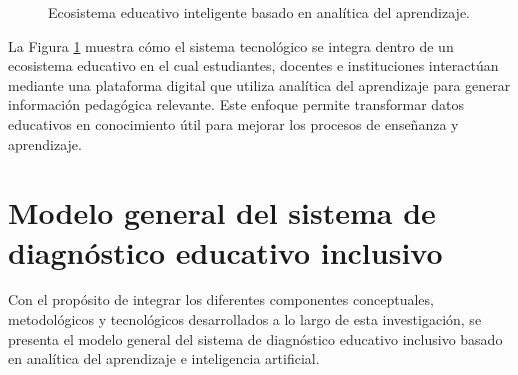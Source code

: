 \begin{refsection}
\begin{figure}[htbp]
{
}

\caption{Ecosistema educativo inteligente basado en analítica del aprendizaje.}
\label{fig:ecosistema}
\end{figure}

La Figura \ref{fig:ecosistema} muestra cómo el sistema tecnológico se integra dentro de un ecosistema educativo en el cual estudiantes, docentes e instituciones interactúan mediante una plataforma digital que utiliza analítica del aprendizaje para generar información pedagógica relevante. Este enfoque permite transformar datos educativos en conocimiento útil para mejorar los procesos de enseñanza y aprendizaje.
\section{Modelo general del sistema de diagnóstico educativo inclusivo}

Con el propósito de integrar los diferentes componentes conceptuales, metodológicos y tecnológicos desarrollados a lo largo de esta investigación, se presenta el modelo general del sistema de diagnóstico educativo inclusivo basado en analítica del aprendizaje e inteligencia artificial.


\end{refsection}
